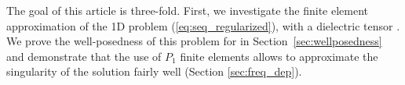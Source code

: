 { %
 





The goal of this article is three-fold. 
First, we investigate the finite element approximation of the 1D 
problem (\ref{eq:seq_regularized}), with a dielectric tensor . 
We prove the well-posedness of this problem for  in Section~\ref{sec:wellposedness} and 
demonstrate that the use of  $P_1$ finite elements allows to approximate the singularity 
of the solution fairly well (Section \ref{sec:freq_dep}). 
}

